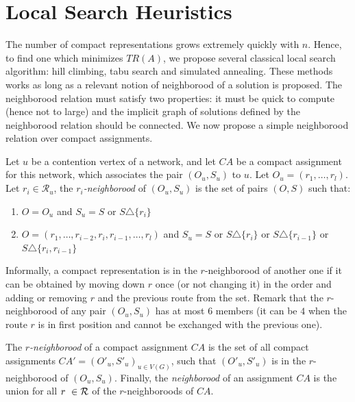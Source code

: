 \documentclass[english]{article}
\begin{document}
\section{Local Search Heuristics}

The number of compact representations grows extremely quickly with $n$. Hence, to find one which minimizes $TR(A)$, we propose several classical local search algorithm: hill climbing, tabu search and simulated annealing. These methods works as long as a relevant notion of neighborood of a solution is proposed. The neighborood relation must satisfy two properties: it must be quick to compute (hence not to large) and the implicit graph of solutions defined
by the neighborood relation should be connected. We now propose a simple neighborood relation over compact assignments.

Let $u$ be a contention vertex of a network, and let $CA$ be a compact assignment for this network, 
 which associates the pair $(O_u,S_u)$ to $u$. Let $O_u = (r_1,\dots,r_l)$.
  Let $r_i \in \mathcal{R}_u$, the \emph{$r_i$-neighborood} of $(O_u,S_u)$ is the set of pairs $(O,S)$ such that:
 
 \begin{enumerate} 
 \item $O = O_u$ and $S_u = S$ or $S \triangle \{r_i\}$  
 \item $O = (r_1,\dots,r_{i-2},r_{i},r_{i-1},\dots,r_{l})$ and $S_u = S$ or $S \triangle \{r_i\}$ or  $S \triangle \{r_{i-1}\}$ or $S \triangle \{r_i,r_{i-1}\}$ 
 \end{enumerate}

Informally, a compact representation is in the $r$-neighborood of another one if it can be obtained by 
moving down $r$ once (or not changing it) in the order and adding or removing $r$ and the previous route from the set. 
Remark that the $r$-neighborood of any pair $(O_u,S_u)$ has at most $6$ members (it can be $4$ when the route $r$ is in first position and cannot be exchanged with the previous one). 

The \emph{$r$-neighborood} of a compact assignment $CA$ is the set of all compact assignments $CA'=(O'_u,S'_u)_{u \in V(G)}$, such that  $(O'_u,S'_u)$ is in the $r$-neighborood of $(O_u,S_u)$. Finally, the \emph{neighborood} of an assignment $CA$ is the union for all $r \in \cal{R}$ of the $r$-neighboroods of $CA$.
\end{document}
